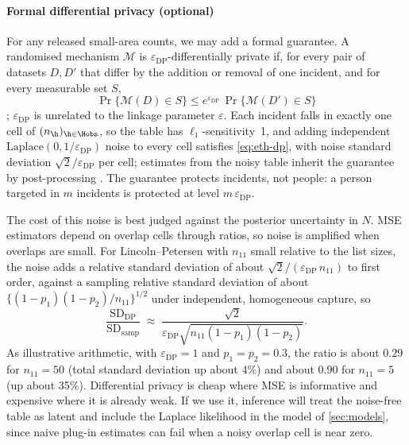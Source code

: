 \paragraph{Formal differential privacy (optional)}
For any released small-area counts, we may add a formal guarantee. A randomised mechanism $\mathcal M$ is $\varepsilon_{\mathrm{DP}}$-differentially private if, for every pair of datasets $D,D'$ that differ by the addition or removal of one incident, and for every measurable set $S$,
\begin{equation}\label{eq:eth-dp}
  \Pr\{\mathcal M(D)\in S\}\le e^{\varepsilon_{\mathrm{DP}}}\,\Pr\{\mathcal M(D')\in S\}
\end{equation}
\citep{dwork2006,dwork2014}; $\varepsilon_{\mathrm{DP}}$ is unrelated to the linkage parameter $\varepsilon$. Each incident falls in exactly one cell of $(n_{\h})_{\h\in\Hobs}$, so the table has $\ell_1$-sensitivity~1, and adding independent $\mathrm{Laplace}(0,1/\varepsilon_{\mathrm{DP}})$ noise to every cell satisfies \eqref{eq:eth-dp}, with noise standard deviation $\sqrt2/\varepsilon_{\mathrm{DP}}$ per cell; estimates from the noisy table inherit the guarantee by post-processing \citep{dwork2014}. The guarantee protects incidents, not people: a person targeted in $m$ incidents is protected at level $m\,\varepsilon_{\mathrm{DP}}$.

The cost of this noise is best judged against the posterior uncertainty in $N$. MSE estimators depend on overlap cells through ratios, so noise is amplified when overlaps are small. For Lincoln--Petersen with $n_{11}$ small relative to the list sizes, the noise adds a relative standard deviation of about $\sqrt2/(\varepsilon_{\mathrm{DP}}\,n_{11})$ to first order, against a sampling relative standard deviation of about $\{(1-p_1)(1-p_2)/n_{11}\}^{1/2}$ under independent, homogeneous capture, so
\begin{equation}\label{eq:eth-ratio}
  \frac{\mathrm{SD}_{\mathrm{DP}}}{\mathrm{SD}_{\mathrm{samp}}}\;\approx\;\frac{\sqrt2}{\varepsilon_{\mathrm{DP}}\sqrt{n_{11}(1-p_1)(1-p_2)}}.
\end{equation}
As illustrative arithmetic, with $\varepsilon_{\mathrm{DP}}=1$ and $p_1=p_2=0.3$, the ratio is about $0.29$ for $n_{11}=50$ (total standard deviation up about 4\%) and about $0.90$ for $n_{11}=5$ (up about 35\%). Differential privacy is cheap where MSE is informative and expensive where it is already weak. If we use it, inference will treat the noise-free table as latent and include the Laplace likelihood in the model of \cref{sec:models}, since naive plug-in estimates can fail when a noisy overlap cell is near zero.

